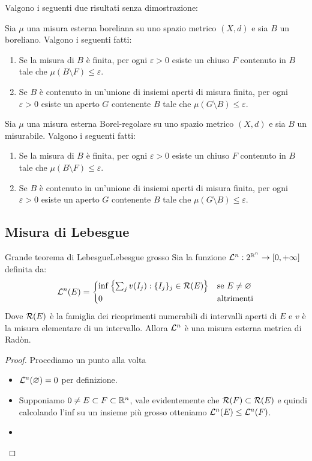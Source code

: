 Valgono i seguenti due risultati senza dimostrazione:
\begin{theorem}{}{}
    Sia $\mu$ una misura esterna boreliana su uno spazio metrico $(X,d)$ e sia $B$ un boreliano. Valgono i seguenti fatti:\begin{enumerate}
        \item Se la misura di $B$ è finita, per ogni $\varepsilon > 0$ esiste un chiuso $F$ contenuto in $B$ tale che $\mu(B\setminus F) \le \varepsilon$.
        \item Se $B$ è contenuto in un'unione di insiemi aperti di misura finita, per ogni $\varepsilon > 0$ esiste un aperto $G$ contenente $B$ tale che $\mu(G\setminus B) \le \varepsilon$. 
    \end{enumerate}
\end{theorem}
\begin{theorem}{}{}
    Sia $\mu$ una misura esterna Borel-regolare su uno spazio metrico $(X,d)$ e sia $B$ un misurabile. Valgono i seguenti fatti:\begin{enumerate}
        \item Se la misura di $B$ è finita, per ogni $\varepsilon > 0$ esiste un chiuso $F$ contenuto in $B$ tale che $\mu(B\setminus F) \le \varepsilon$.
        \item Se $B$ è contenuto in un'unione di insiemi aperti di misura finita, per ogni $\varepsilon > 0$ esiste un aperto $G$ contenente $B$ tale che $\mu(G\setminus B) \le \varepsilon$. 
    \end{enumerate}    
\end{theorem}

\subsection{Misura di Lebesgue}
\begin{theorem}{Grande teorema di Lebesgue}{Lebesgue grosso}
    Sia la funzione $\mathcal{L}^n : 2^{\mathbb{R}^n} \to [0,+\infty]$ definita da:
    \[\mathcal{L}^n (E) = \begin{cases}
        \inf\left\{ \sum_j v(I_j) : \{I_j\}_j \in \mathcal{R}(E)  \right\}& \text{se } E \neq \varnothing\\ 0 & \text{altrimenti}
    \end{cases}\]
    Dove $\mathcal{R}(E)$ è la famiglia dei ricoprimenti numerabili di intervalli aperti di $E$ e $v$ è la misura elementare di un intervallo. Allora $\mathcal{L}^n$ è una misura esterna metrica di Radòn.
    \begin{proof}
        Procediamo un punto alla volta
        \begin{itemize}
            \item $\mathcal{L}^n(\varnothing) = 0$ per definizione.
            \item Supponiamo $0 \neq E \subset F \subset \mathbb{R}^n$, vale evidentemente che $\mathcal{R}(F) \subset \mathcal{R}(E)$ e quindi calcolando l'inf su un insieme più grosso otteniamo $\mathcal{L}^n(E) \le \mathcal{L}^n(F)$.
            \item 
        \end{itemize}
    \end{proof}
\end{theorem}